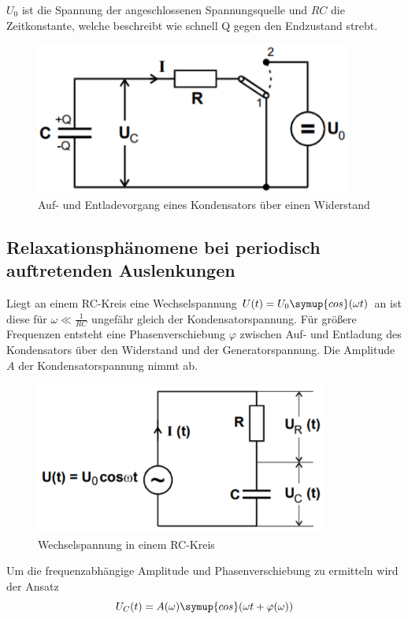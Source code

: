$U_0$ ist die Spannung der angeschlossenen Spannungsquelle und
$RC$ die Zeitkonstante, welche beschreibt wie schnell Q gegen den Endzustand strebt.

\begin{figure}[H]
  \centering
  \includegraphics[height=5cm]{entladung.PNG}
  \caption{Auf- und Entladevorgang eines Kondensators über einen Widerstand \cite{sample}}
  \label{fig:Kondensator}
\end{figure}

\subsection{Relaxationsphänomene bei periodisch auftretenden Auslenkungen}
Liegt an einem RC-Kreis eine Wechselspannung $U(t) = U_0 \symup{cos}(\omega t)$ an ist diese
für $\omega \ll \frac{1}{RC}$ ungefähr gleich der Kondensatorspannung. Für größere
Frequenzen entsteht eine Phasenverschiebung $\varphi$ zwischen Auf- und Entladung des Kondensators
über den Widerstand und der Generatorspannung. Die Amplitude $A$ der Kondensatorspannung nimmt ab.


\begin{figure}[H]
  \centering
  \includegraphics[height=5cm]{wechselspannung.PNG}
  \caption{Wechselspannung in einem RC-Kreis \cite{sample}}
  \label{fig:wechselspannung}
\end{figure}

Um die frequenzabhängige Amplitude und Phasenverschiebung zu ermitteln wird der Ansatz
\begin{equation}
  U_C(t) = A(\omega)\symup{cos}(\omega t + \varphi(\omega))
\end{equation}


